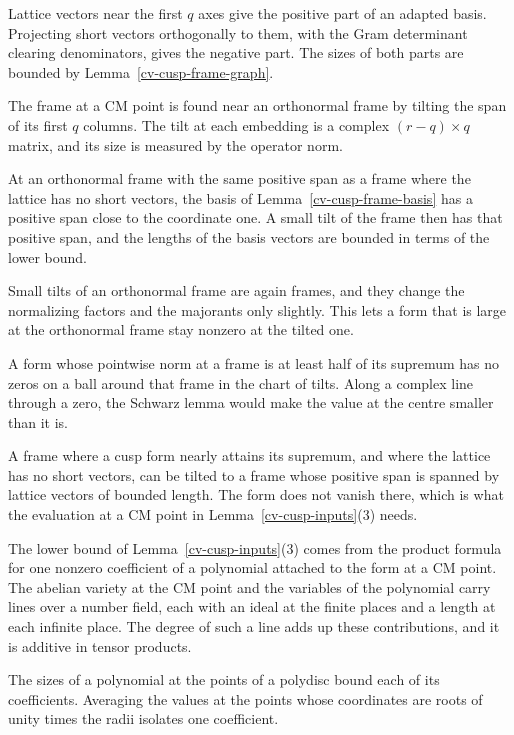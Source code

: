 Lattice vectors near the first $q$ axes give the positive part of an adapted basis. Projecting short vectors
orthogonally to them, with the Gram determinant clearing denominators, gives the negative part. The sizes of
both parts are bounded by Lemma~\ref{cv-cusp-frame-graph}.

The frame at a CM point is found near an orthonormal frame by tilting the span of its first $q$ columns.
The tilt at each embedding is a complex $(r-q)\times q$ matrix, and its size is measured by the operator
norm.

At an orthonormal frame with the same positive span as a frame where the lattice has no short vectors, the
basis of Lemma~\ref{cv-cusp-frame-basis} has a positive span close to the coordinate one. A small tilt of the
frame then has that positive span, and the lengths of the basis vectors are bounded in terms of the lower
bound.

Small tilts of an orthonormal frame are again frames, and they change the normalizing factors and the
majorants only slightly. This lets a form that is large at the orthonormal frame stay nonzero at the tilted
one.

A form whose pointwise norm at a frame is at least half of its supremum has no zeros on a ball around that
frame in the chart of tilts. Along a complex line through a zero, the Schwarz lemma would make the value at
the centre smaller than it is.

A frame where a cusp form nearly attains its supremum, and where the lattice has no short vectors, can be
tilted to a frame whose positive span is spanned by lattice vectors of bounded length. The form does not
vanish there, which is what the evaluation at a CM point in Lemma~\ref{cv-cusp-inputs}(3) needs.

The lower bound of Lemma~\ref{cv-cusp-inputs}(3) comes from the product formula for one nonzero coefficient
of a polynomial attached to the form at a CM point. The abelian variety at the CM point and the variables of
the polynomial carry lines over a number field, each with an ideal at the finite places and a length at each
infinite place. The degree of such a line adds up these contributions, and it is additive in tensor products.

The sizes of a polynomial at the points of a polydisc bound each of its coefficients. Averaging the values at
the points whose coordinates are roots of unity times the radii isolates one coefficient.

